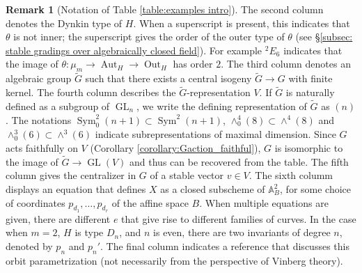 \documentclass{article} %
\numberwithin{equation}{section}
\theoremstyle{definition}
\newtheorem{remark}[proposition]{Remark}
\DeclareMathOperator{\GL}{GL}
\DeclareMathOperator{\Aut}{Aut}
\DeclareMathOperator{\Out}{Out}
\DeclareMathOperator{\Sym}{Sym}
\newcommand{\A}{\mathbb{A}}
\begin{document}
\begin{remark}[Notation of Table \ref{table:examples intro}]    
    The second column denotes the Dynkin type of $H$.
    When a superscript is present, this indicates that $\theta$ is not inner; the superscript gives the order of the outer type of $\theta$ (see \S\ref{subsec: stable gradings over algebraically closed field}). For example $^2E_6$ indicates that the image of $\theta\colon \mu_m\rightarrow \Aut_H \rightarrow \Out_H$ has order $2$.
    The third column denotes an algebraic group $\tilde{G}$ such that there exists a central isogeny $\tilde{G}\rightarrow G$ with finite kernel. 
    The fourth column describes the $\tilde{G}$-representation $V$.
    If $\tilde{G}$ is naturally defined as a subgroup of $\GL_n$, we write the defining representation of $\tilde{G}$ as $(n)$. 
    The notations $\Sym^2_0(n+1)\subset \Sym^2(n+1)$, $\wedge^4_0(8)\subset \wedge^4(8)$ and $\wedge^3_0(6)\subset \wedge^3(6)$ indicate subrepresentations of maximal dimension.
    Since $G$ acts faithfully on $V$ (Corollary \ref{corollary:Gaction_faithful}), $G$ is isomorphic to the image of $\tilde{G}\rightarrow \GL(V)$ and thus can be recovered from the table. The fifth column gives the centralizer in $G$ of a stable vector $v \in V$.
    The sixth columm displays an equation that defines $X$ as a closed subscheme of $\A^2_B$, for some choice of coordinates $p_{d_1}, \dots, p_{d_r}$ of the affine space $B$. 
    When multiple equations are given, there are different $e$ that give rise to different families of curves. 
    In the case when $m = 2$, $H$ is type $D_n$, and $n$ is even, there are two invariants of degree $n$, denoted by $p_n$ and $p_{n}'$.
    The final column indicates a reference that discusses this orbit parametrization (not necessarily from the perspective of Vinberg theory).
\end{remark}




\end{document}
